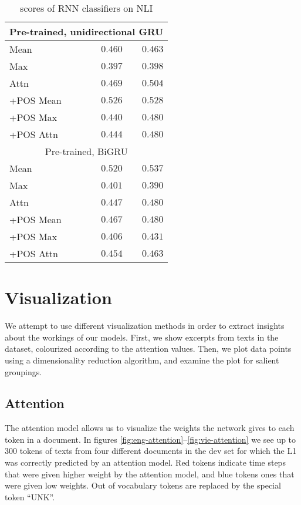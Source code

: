 \begin{table}
\begin{tabular}{lrr}
    \midrule \multicolumn{3}{c}{Pre-trained, unidirectional GRU} \\ \midrule
    Mean & $0.460$ & $0.463$ \\
    Max & $0.397$ & $0.398$ \\
    Attn & $0.469$ & $0.504$ \\
    +POS Mean & $\mathbf{0.526}$ & $0.528$ \\
    +POS Max & $0.440$ & $0.480$ \\
    +POS Attn & $0.444$ & $0.480$ \\
    \midrule \multicolumn{3}{c}{Pre-trained, BiGRU} \\ \midrule
    Mean & $0.520$ & $\mathbf{0.537}$ \\
    Max & $0.401$ & $0.390$ \\
    Attn & $0.447$ & $0.480$ \\
    +POS Mean & $0.467$ & $0.480$ \\
    +POS Max & $0.406$ & $0.431$ \\
    +POS Attn & $0.454$ & $0.463$ \\
    \bottomrule
  \end{tabular}
  \caption{\FI scores of RNN classifiers on NLI}
  \label{tab:rnn-nli-results}
\end{table}


\section{Visualization}

We attempt to use different visualization methods in order to extract
insights about the workings of our models. First, we show excerpts from texts
in the dataset, colourized according to the attention values. Then, we plot
data points using a dimensionality reduction algorithm, and examine the plot
for salient groupings.


\subsection{Attention}

The attention model allows us to visualize the weights the network gives to
each token in a document. In figures
\ref{fig:eng-attention}--\ref{fig:vie-attention} we see up to 300 tokens of
texts from four different documents in the dev set for which the L1 was
correctly predicted by an attention model. Red tokens indicate time steps
that were given higher weight by the attention model, and blue tokens ones
that were given low weights. Out of vocabulary tokens are replaced by the
special token ``UNK''.

